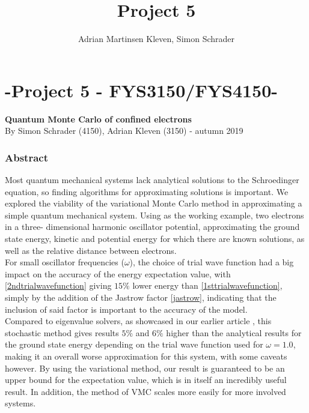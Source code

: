 \documentclass[10pt,a4paper]{article}
\author{Adrian Martinsen Kleven, Simon Schrader}
\title{Project 5}
\begin{document}
\part*{-Project 5 - FYS3150/FYS4150-
}
{\large \textbf{Quantum Monte Carlo of confined electrons}}\\
{\large By Simon Schrader (4150), Adrian Kleven (3150) - autumn 2019
}
\tableofcontents

\listoffigures
\listoftables


\clearpage

\section{Abstract}
Most quantum mechanical systems lack analytical solutions to the Schroedinger equation, so finding algorithms for approximating solutions is important. We explored the viability of the variational Monte Carlo method in approximating a simple quantum mechanical system. Using as the working example, two electrons in a three- dimensional harmonic oscillator potential, approximating the ground state energy, kinetic and potential energy for which there are known solutions\cite{Project2}, as well as the relative distance between electrons.\\
For small oscillator frequencies ($\omega$), the choice of trial wave function had a big impact on the accuracy of the energy expectation value, with \eqref{2ndtrialwavefunction} giving $15\%$ lower energy than \eqref{1sttrialwavefunction}, simply by the addition of the Jastrow factor \eqref{jastrow}, indicating that the inclusion of said factor is important to the accuracy of the model.\\Compared to eigenvalue solvers, as showcased in our earlier article \cite{Project2}, this stochastic method gives results $5\%$ and $6\%$ higher than the analytical results for the ground state energy depending on the trial wave function used for $\omega=1.0$,  making it an overall worse approximation for this system, with some caveats however. By using the variational method, our result is guaranteed to be an upper bound for the expectation value, which is in itself an incredibly useful result. In addition, the method of VMC scales more easily for more involved systems.
\end{document}
